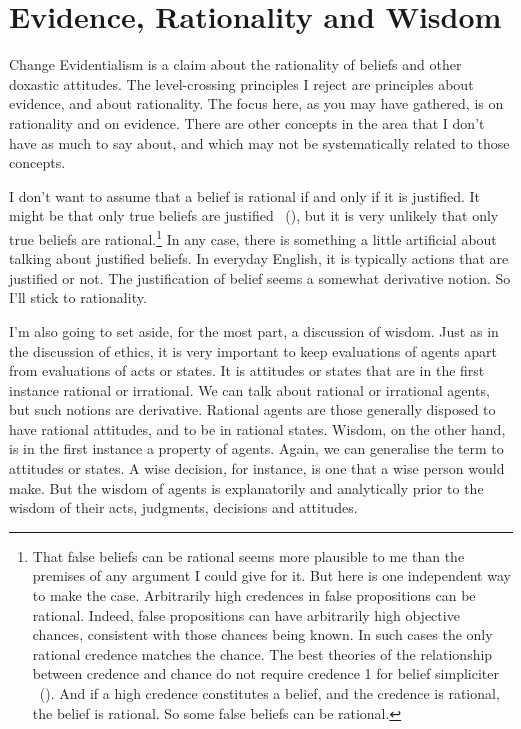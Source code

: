 \documentclass[
  10pt,
  letterpaper,
  twoside]{scrbook}
\begin{document}
\section{Evidence, Rationality and
Wisdom}\label{evidencerationalityandwisdom}

Change Evidentialism is a claim about the rationality of beliefs and
other doxastic attitudes. The level-crossing principles I reject are
principles about evidence, and about rationality. The focus here, as you
may have gathered, is on rationality and on evidence. There are other
concepts in the area that I don't have as much to say about, and which
may not be systematically related to those concepts.

I don't want to assume that a belief is rational if and only if it is
justified. It might be that only true beliefs are justified
~(), but it is very
unlikely that only true beliefs are rational.\footnote{That false
  beliefs can be rational seems more plausible to me than the premises
  of any argument I could give for it. But here is one independent way
  to make the case. Arbitrarily high credences in false propositions can
  be rational. Indeed, false propositions can have arbitrarily high
  objective chances, consistent with those chances being known. In such
  cases the only rational credence matches the chance. The best theories
  of the relationship between credence and chance do not require
  credence 1 for belief simpliciter
  ~(). And if a high
  credence constitutes a belief, and the credence is rational, the
  belief is rational. So some false beliefs can be rational.} In any
case, there is something a little artificial about talking about
justified beliefs. In everyday English, it is typically actions that are
justified or not. The justification of belief seems a somewhat
derivative notion. So I'll stick to rationality.

I'm also going to set aside, for the most part, a discussion of wisdom.
Just as in the discussion of ethics, it is very important to keep
evaluations of agents apart from evaluations of acts or states. It is
attitudes or states that are in the first instance rational or
irrational. We can talk about rational or irrational agents, but such
notions are derivative. Rational agents are those generally disposed to
have rational attitudes, and to be in rational states. Wisdom, on the
other hand, is in the first instance a property of agents. Again, we can
generalise the term to attitudes or states. A wise decision, for
instance, is one that a wise person would make. But the wisdom of agents
is explanatorily and analytically prior to the wisdom of their acts,
judgments, decisions and attitudes.
\end{document}
